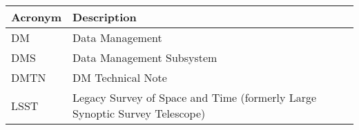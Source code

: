 \addtocounter{table}{-1}
\begin{longtable}{p{}p{}}\hline
\textbf{Acronym} & \textbf{Description}  \\\hline

DM & Data Management \\\hline
DMS & Data Management Subsystem \\\hline
DMTN & DM Technical Note \\\hline
LSST & Legacy Survey of Space and Time (formerly Large Synoptic Survey Telescope) \\\hline
\end{longtable}
